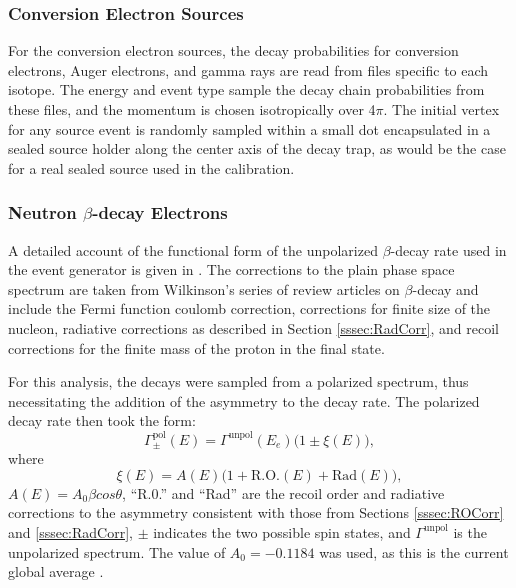 \subsubsection{Conversion Electron Sources}
For the conversion electron sources, the decay probabilities for conversion electrons,
Auger electrons, and gamma rays are read from files specific to each isotope.
The energy and event type sample the decay chain probabilities from these files, and
the momentum is chosen isotropically over 4$\pi$. The initial vertex for any source
event is randomly sampled within a small dot encapsulated in a sealed source holder
along the center axis of the decay trap, as would be the case for a real sealed
source used in the calibration.

\subsubsection{Neutron $\beta$-decay Electrons} \label{sssec:betaSim}

A detailed account of the functional form of the unpolarized $\beta$-decay rate used in the
event generator
is given in \cite{mpmThesis}. The corrections to the plain phase space spectrum are taken from
Wilkinson's series of review articles on $\beta$-decay
\cite{wilkinson1982,wilkinson1989evaluation,wilkinson1990evaluation,wilkinson1993evaluation,
  wilkinson1995evaluation,wilkinson1997evaluation,wilkinson1998evaluation} and include
the Fermi function coulomb correction, corrections for finite size of the nucleon, radiative
corrections as described in Section \ref{sssec:RadCorr}, and recoil corrections for the finite
mass of the proton in the final state.

For this analysis, the decays were sampled from a polarized spectrum, thus necessitating the
addition of the asymmetry to the decay rate. The polarized decay rate then took the form:
\begin{equation}
  \Gamma^{\mathrm{pol}}_\pm(E) = \Gamma^{\mathrm{unpol}}(E_e) \bigg( 1 \pm \xi(E) \bigg),
\end{equation}
where
\begin{equation}
  \xi(E) = A(E)\Big(1+\mathrm{R.O.}(E)+\mathrm{Rad}(E)\Big),
\end{equation}
$A(E)=A_0\beta cos\theta$, ``R.0.'' and ``Rad'' are the recoil order and radiative corrections to the asymmetry
consistent with those from Sections \ref{sssec:ROCorr} and \ref{sssec:RadCorr}, $\pm$ indicates the two possible spin states,
and $\Gamma^{\mathrm{unpol}}$ is the unpolarized
spectrum. The value of $A_0= -0.1184$ was used, as this is the current global average \cite{pdg}.

